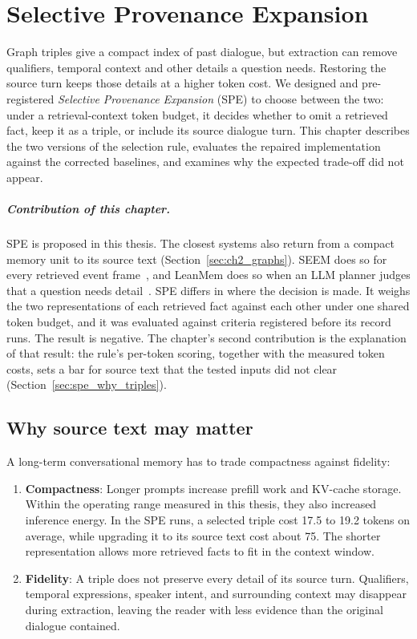 
\chapter{Selective Provenance Expansion}
\label{ch:spe}

Graph triples give a compact index of past dialogue, but extraction can remove qualifiers, temporal
context and other details a question needs. Restoring the source turn keeps those details at a higher
token cost. We designed and pre-registered \emph{Selective Provenance Expansion} (SPE) to choose
between the two: under a retrieval-context token budget, it decides whether to omit a retrieved fact,
keep it as a triple, or include its source dialogue turn. This chapter describes the two versions of
the selection rule, evaluates the repaired implementation against the corrected baselines, and
examines why the expected trade-off did not appear.

\paragraph{Contribution of this chapter.} SPE is proposed in this thesis. The closest systems also
return from a compact memory unit to its source text (Section~\ref{sec:ch2_graphs}). SEEM does so
for every retrieved event frame~\citep{seem}, and LeanMem does so when an LLM planner judges that a
question needs detail~\citep{leanmem}. SPE differs in where the decision is made. It weighs the
two representations of each retrieved fact against each other under one shared token budget, and
it was evaluated against criteria registered before its record runs. The result is negative. The
chapter's second contribution is the explanation of that result: the rule's per-token scoring,
together with the measured token costs, sets a bar for source text that the tested inputs did not
clear (Section~\ref{sec:spe_why_triples}).

\section{Why source text may matter}
\label{sec:spe_motivation}

A long-term conversational memory has to trade compactness against fidelity:

\begin{enumerate}
  \item \textbf{Compactness}: Longer prompts increase prefill work and KV-cache storage. Within the
        operating range measured in this thesis, they also increased inference energy. In the SPE runs,
        a selected triple cost 17.5 to 19.2 tokens on average, while upgrading it to its source text
        cost about 75. The shorter representation allows more retrieved facts to fit in the context
        window.
  \item \textbf{Fidelity}: A triple does not preserve every detail of its source turn. Qualifiers,
        temporal expressions, speaker intent, and surrounding context may disappear during extraction,
        leaving the reader with less evidence than the original dialogue contained.
\end{enumerate}

